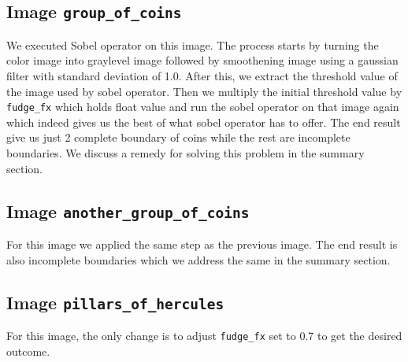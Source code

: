 \subsection{Image \texttt{group\_of\_coins}}
We executed Sobel operator on this image. The process starts by turning the color image into graylevel image followed by smoothening image using a gaussian filter with standard deviation of 1.0. After this, we extract the threshold value of the image used by sobel operator. Then we multiply the initial threshold value by \texttt{fudge\_fx} which holds float value and run the sobel operator on that image again which indeed gives us the best of what sobel operator has to offer.
The end result give us just 2 complete boundary of coins while the rest are incomplete boundaries. We discuss a remedy for solving this problem in the summary section.

\subsection{Image \texttt{another\_group\_of\_coins}}
For this image we applied the same step as the previous image. The end result is also incomplete boundaries which we address the same in the summary section.

\subsection{Image \texttt{pillars\_of\_hercules}}
For this image, the only change is to adjust \texttt{fudge\_fx} set to 0.7 to get the desired outcome.

